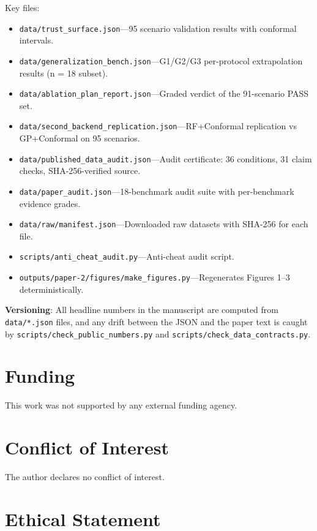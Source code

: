 \documentclass[journal]{IEEEtran}
\begin{document}
Key files:
\begin{itemize}
    \item \texttt{data/trust_surface.json}---95 scenario validation results
    with conformal intervals.
    \item \texttt{data/generalization_bench.json}---G1/G2/G3 per-protocol
    extrapolation results (n = 18 subset).
    \item \texttt{data/ablation_plan_report.json}---Graded verdict of the
    91-scenario PASS set.
    \item \texttt{data/second_backend_replication.json}---RF+Conformal
    replication vs GP+Conformal on 95 scenarios.
    \item \texttt{data/published_data_audit.json}---Audit certificate: 36
    conditions, 31 claim checks, SHA-256-verified source.
    \item \texttt{data/paper_audit.json}---18-benchmark audit suite with
    per-benchmark evidence grades.
    \item \texttt{data/raw/manifest.json}---Downloaded raw datasets with
    SHA-256 for each file.
    \item \texttt{scripts/anti_cheat_audit.py}---Anti-cheat audit script.
    \item \texttt{outputs/paper-2/figures/make_figures.py}---Regenerates
    Figures 1--3 deterministically.
\end{itemize}

\textbf{Versioning}: All headline numbers in the manuscript are computed from
\texttt{data/*.json} files, and any drift between the JSON and the paper text
is caught by \texttt{scripts/check_public_numbers.py} and
\texttt{scripts/check_data_contracts.py}.

\section*{Funding}

This work was not supported by any external funding agency.

\section*{Conflict of Interest}

The author declares no conflict of interest.

\section*{Ethical Statement}
\end{document}
